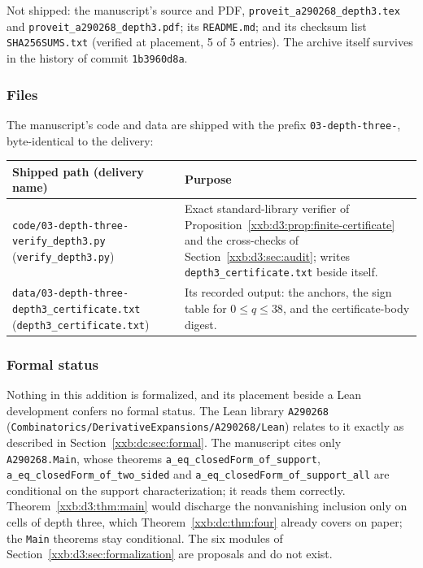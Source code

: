 \documentclass[11pt,a4paper]{article}
\numberwithin{equation}{section}
\theoremstyle{definition}
\theoremstyle{remark}
\theoremstyle{plain}
\begin{document}
Not shipped: the manuscript's source and PDF,
\texttt{proveit\_\allowbreak a290268\_\allowbreak depth3.tex} and
\texttt{proveit\_\allowbreak a290268\_\allowbreak depth3.pdf}; its
\texttt{README.md}; and its checksum list \texttt{SHA256SUMS.txt} (verified at
placement, 5 of 5 entries).  The archive
itself survives in the history of commit \texttt{1b3960d8a}.

\subsubsection{Files}
The manuscript's code and data are shipped with the prefix
\texttt{03-depth-\allowbreak three-\allowbreak }, byte-identical to the delivery:
\begin{longtable}{@{}>{\raggedright\arraybackslash}p{}>{\raggedright\arraybackslash}p{}@{}}
\toprule
Shipped path (delivery name) & Purpose\\
\midrule
\endhead
\texttt{code/03-depth-\allowbreak three-\allowbreak verify\_depth3.py} (\texttt{verify\_\allowbreak depth3.py}) & Exact standard-library verifier of Proposition~\ref{xxb:d3:prop:finite-certificate} and the cross-checks of Section~\ref{xxb:d3:sec:audit}; writes \texttt{depth3\_\allowbreak certificate.txt} beside itself.\\
\texttt{data/03-depth-\allowbreak three-\allowbreak depth3\_certificate.txt} (\texttt{depth3\_\allowbreak certificate.txt}) & Its recorded output: the anchors, the sign table for $0\le q\le38$, and the certificate-body digest.\\
\bottomrule
\end{longtable}

\subsubsection{Formal status}\label{xxb:d3:sec:formal}
Nothing in this addition is formalized, and its placement beside a Lean
development confers no formal status.  The Lean library \texttt{A290268}
(\texttt{Combinatorics/\allowbreak DerivativeExpansions/\allowbreak A290268/\allowbreak Lean})
relates to it exactly as described in Section~\ref{xxb:dc:sec:formal}.  The
manuscript cites only \texttt{A290268.Main}, whose theorems
\texttt{a\_\allowbreak eq\_\allowbreak closedForm\_\allowbreak of\_\allowbreak support},
\texttt{a\_\allowbreak eq\_\allowbreak closedForm\_\allowbreak of\_\allowbreak two\_\allowbreak sided} and
\texttt{a\_\allowbreak eq\_\allowbreak closedForm\_\allowbreak of\_\allowbreak support\_\allowbreak all}
are conditional on the support characterization; it reads them correctly.
Theorem~\ref{xxb:d3:thm:main} would discharge the nonvanishing inclusion only
on cells of depth three, which Theorem~\ref{xxb:dc:thm:four} already covers on
paper; the \texttt{Main} theorems stay conditional.  The six modules of
Section~\ref{xxb:d3:sec:formalization} are proposals and do not exist.
\end{document}
